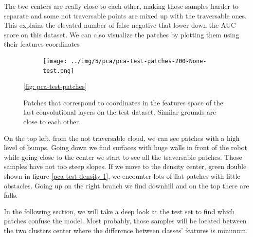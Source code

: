 \documentclass[../document.tex]{subfiles}
\begin{document}
The two centers are really close to each other, making those samples harder to separate and some not traversable points are mixed up with the traversable ones. This explains the elevated number of false negative that lower down the AUC score on this dataset. We can also visualize the patches by plotting them using their features coordinates
\begin{figure} [htbp]
    \centering
    \begin{subfigure}[b]{1\textwidth}
        \texttt{[image: ../img/5/pca/pca-test-patches-200-None-test.png]}
    \end{subfigure}
\caption{Patches that correspond to coordinates in the features space of the last convolutional layers on the test dataset. Similar grounds are close to each other.}
\ref{fig: pca-test-patches}
\end{figure}
On the top left, from the not traversable cloud, we can see patches with a high level of bumps. Going down we find surfaces with huge walls in front of the robot while going close to the center we start to see all the traversable patches. Those samples have not too steep slopes. If we move to the density center, green double shown in figure \ref{pca-test-density-1}, we encounter lots of flat patches with little obstacles. Going up on the right branch we find downhill and on the top there are falls. 

In the following section, we will take a deep look at the test set to find which patches confuse the model. Most probably, those samples will be located between the two clusters center where the difference between classes' features is minimum.
\end{document}
